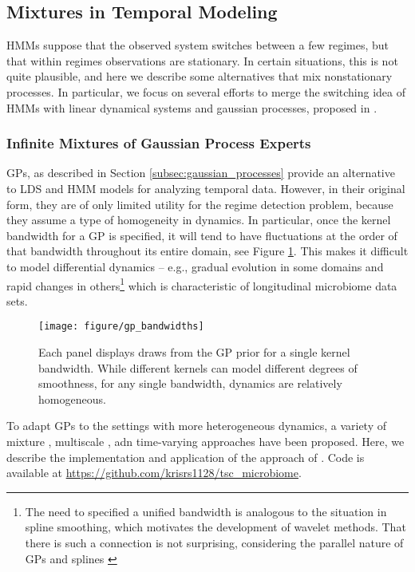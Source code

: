 \documentclass{article}
\begin{document}
\subsection{Mixtures in Temporal Modeling}

HMMs suppose that the observed system switches between a few regimes, but that
within regimes observations are stationary. In certain situations, this is not
quite plausible, and here we describe some alternatives that mix nonstationary
processes. In particular, we focus on several efforts to merge the switching idea of
HMMs with linear dynamical systems and gaussian processes, proposed in
\citep{ghahramani1998variational, rasmussen2002infinite,
  fox2012multiresolution}.


\subsubsection{Infinite Mixtures of Gaussian Process Experts}
\label{subsec:label}

GPs, as described in Section \ref{subsec:gaussian_processes} provide an
alternative to LDS and HMM models for analyzing temporal data. However, in their
original form, they are of only limited utility for the regime detection
problem, because they assume a type of homogeneity in dynamics. In particular,
once the kernel bandwidth for a GP is specified, it will tend to have
fluctuations at the order of that bandwidth throughout its entire domain, see
Figure \ref{fig:gp_bandwidths}. This makes it difficult to model differential
dynamics -- e.g., gradual evolution in some domains and rapid changes in
others\footnote{The need to specified a unified bandwidth is analogous to the
  situation in spline smoothing, which motivates the development of wavelet
  methods\citep{donoho1995adapting}. That there is such a connection is not
  surprising, considering the parallel nature of GPs and splines
  \citep{kimeldorf1970correspondence}} which is characteristic of longitudinal
microbiome data sets.

\begin{figure}[ht]
  \centering
  \texttt{[image: figure/gp\_bandwidths]}
  \caption{Each panel displays draws from the GP prior for a single kernel
    bandwidth. While different kernels can model different degrees of
    smoothness, for any single bandwidth, dynamics are relatively
    homogeneous. \label{fig:gp_bandwidths} }
\end{figure}

To adapt GPs to the settings with more heterogeneous dynamics, a variety of
mixture \citep{tresp2001mixtures, rasmussen2002infinite}, multiscale
\citep{fox2012multiresolution, samostring}, adn time-varying
\citep{paciorek2003nonstationary, heinonen2016non} approaches have been
proposed. Here, we describe the implementation and application of the approach
of \citep{rasmussen2002infinite}. Code is available at
\url{https://github.com/krisrs1128/tsc_microbiome}.
\end{document}
